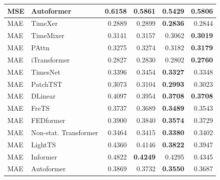 \begin{longtable}{llrrrr}
MSE & Autoformer & 0.6158 & 0.5861 & \textbf{0.5429} & 0.5806 \\
\midrule
MAE & TimeXer & 0.2889 & 0.2899 & \textbf{0.2836} & 0.2844 \\
MAE & TimeMixer & 0.3141 & 0.3157 & 0.3062 & \textbf{0.3019} \\
MAE & PAttn & 0.3275 & 0.3274 & 0.3182 & \textbf{0.3179} \\
MAE & iTransformer & 0.2827 & 0.2830 & 0.2802 & \textbf{0.2760} \\
MAE & TimesNet & 0.3396 & 0.3454 & \textbf{0.3327} & 0.3348 \\
MAE & PatchTST & 0.3073 & 0.3104 & \textbf{0.2993} & 0.3023 \\
MAE & DLinear & 0.4097 & 0.3954 & \textbf{0.3708} & \textbf{0.3708} \\
MAE & FreTS & 0.3737 & 0.3689 & \textbf{0.3489} & 0.3543 \\
MAE & FEDformer & 0.3900 & 0.3840 & \textbf{0.3574} & 0.3729 \\
MAE & Non-stat. Transformer & 0.3464 & 0.3415 & \textbf{0.3380} & 0.3402 \\
MAE & LightTS & 0.4360 & 0.4146 & \textbf{0.3822} & 0.3947 \\
MAE & Informer & 0.4822 & \textbf{0.4249} & 0.4295 & 0.4345 \\
MAE & Autoformer & 0.3869 & 0.3732 & \textbf{0.3550} & 0.3687 \\
\end{longtable}
\endgroup

